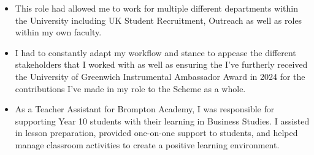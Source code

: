\documentclass[10pt,a4paper,ragged2e]{altacv}
\begin{document}
\divider

\begin{itemize}
\item This role had allowed me to work for multiple different departments within the University including UK Student Recruitment, Outreach as well as roles within my own faculty. 
\item I had to constantly adapt my workflow and stance to appease the different stakeholders that I worked with as well as ensuring the  I've furtherly received the University of Greenwich Instrumental Ambassador Award in 2024 for the contributions I've made in my role to the Scheme as a whole.

\end{itemize}

\divider

\begin{itemize}
\item As a Teacher Assistant for Brompton Academy, I was responsible for supporting Year 10 students with their learning in Business Studies. I assisted in lesson preparation, provided one-on-one support to students, and helped manage classroom activities to create a positive learning environment.
\end{itemize}





\end{document}
